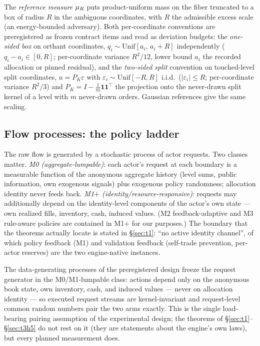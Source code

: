 The \emph{reference measure} $\mu_{R}$ puts product-uniform mass on the fiber
truncated to a box of radius $R$ in the ambiguous coordinates, with $R$ the
admissible excess scale (an energy-bounded adversary). Both per-coordinate
conventions are preregistered as frozen contract items and read as deviation
budgets: the \emph{one-sided box} on orthant coordinates,
$q_i \sim \mathrm{Unif}[a_i,\, a_i + R]$ independently ($q_i - a_i \in [0,R]$;
per-coordinate variance $R^2/12$, lower bound $a_i$ the recorded allocation or
pinned residual), and the \emph{two-sided split} convention on touched-level
split coordinates, $u = P_K \varepsilon$ with $\varepsilon_i \sim
\mathrm{Unif}[-R,R]$ i.i.d.\ ($|\varepsilon_i| \le R$; per-coordinate variance
$R^2/3$) and $P_K = I - \tfrac{1}{m}\mathbf{1}\mathbf{1}^{\top}$ the
projection onto the never-drawn split kernel of a level with $m$ never-drawn
orders. Gaussian references give the same scaling.

\subsection{Flow processes: the policy ladder}
\label{sec:policies}

The raw flow is generated by a stochastic process of actor requests. Two
classes matter. \emph{M0 (aggregate-lumpable)}: each actor's request at each
boundary is a measurable function of the anonymous aggregate history (level
sums, public information, own exogenous signals) plus exogenous policy
randomness; allocation identity never feeds back. \emph{M1$+$
(identity/resource-responsive)}: requests may additionally depend on the
identity-level components of the actor's own state --- own realized fills,
inventory, cash, induced values. (M2 feedback-adaptive and M3 rule-aware
policies are contained in M1$+$ for our purposes.) The boundary that the
theorems actually locate is stated in \S\ref{sec:t1}: ``no active identity
channel'', of which policy feedback (M1) and validation feedback (self-trade
prevention, per-actor reserves) are the two engine-native instances.

The data-generating processes of the preregistered design freeze the request
generator in the M0/M1-lumpable class: actions depend only on the anonymous
book state, own inventory, cash, and induced values --- never on allocation
identity --- so executed request streams are kernel-invariant and
request-level common random numbers pair the two arms exactly. This is the
single load-bearing pairing assumption of the experimental design; the
theorems of \S\ref{sec:t1}--\S\ref{sec:t3h5} do not rest on it (they are
statements about the engine's own laws), but every planned measurement does.

